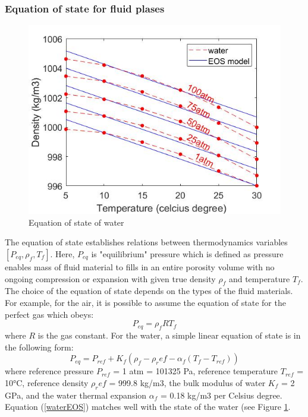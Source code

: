 \documentclass[preprint,12pt]{elsarticle}
\begin{document}
\subsubsection{Equation of state for fluid plases}
%
%
\begin{figure}[h]
\center
\includegraphics[scale=.5]{water1.jpg}
\caption{Equation of state of water}
\label{fig:water1}
\end{figure}
%
%
The equation of state establishes relations between thermodynamics variables $[P_{eq}, \rho_f, T_f]$. Here, $P_{eq}$ is "equilibrium" pressure which is defined as pressure enables mass of fluid material to fills in an entire porosity volume with no ongoing compression or expansion with given true density $\rho_f$ and temperature $T_f$. The choice of the equation of state depends on the types of the fluid materials. For example, for the air, it is possible to assume the equation of state for the perfect gas which obeys:
%
%
\begin{equation}
    P_{eq} = \rho_f R T_f
\end{equation}
%
%
where $R$ is the gas constant. For the water, a simple linear equation of state is in the following form:
%
%
\begin{equation}
    P_{eq} = P_{ref} + K_f (\rho_f - \rho_ref - \alpha_f(T_f - T_{ref}))
\label{waterEOS}
\end{equation}
%
%
where reference pressure $P_{ref}$ = 1 atm = 101325 Pa, reference temperature $T_{ref}$ = 10°C, reference density  $\rho_ref$ = 999.8 kg/m3, the bulk modulus of water $K_f$ = 2 GPa, and the water thermal expansion $\alpha_f$ = 0.18 kg/m3 per Celsius degree. Equation (\ref{waterEOS}) matches well with the state of the water (see Figure \ref{fig:water1}.
\end{document}
